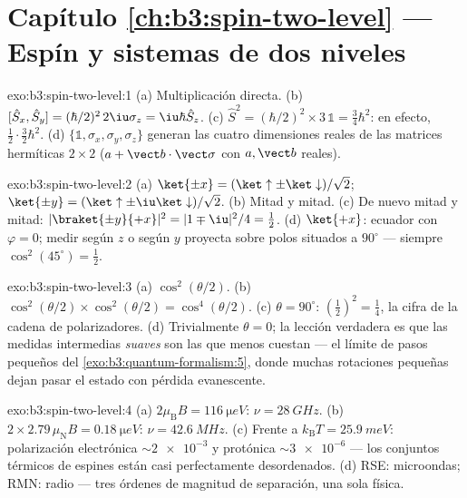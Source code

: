 \section*{Capítulo \ref{ch:b3:spin-two-level} --- Espín y sistemas de dos niveles}

\begin{solution}{exo:b3:spin-two-level:1}
(a) Multiplicación directa. (b) $[\hat S_x, \hat S_y] =
(\hbar/2)^2\,2\iu\sigma_z = \iu\hbar\hat S_z$. (c) $\hat S^2 =
(\hbar/2)^2 \times 3\,\mathbb 1 = \tfrac34\hbar^2$: en efecto,
$\tfrac12\cdot\tfrac32\hbar^2$. (d) $\{\mathbb 1, \sigma_x,
\sigma_y, \sigma_z\}$ generan las cuatro dimensiones reales de las matrices
hermíticas $2\times2$ ($a + \vect b\cdot\vect\sigma$ con $a,
\vect b$ reales).
\end{solution}

\begin{solution}{exo:b3:spin-two-level:2}
(a) $\ket{\pm x} = (\ket\uparrow \pm \ket\downarrow)/\sqrt2$;
$\ket{\pm y} = (\ket\uparrow \pm \iu\ket\downarrow)/\sqrt2$. (b)
Mitad y mitad. (c) De nuevo mitad y mitad: $|\braket{\pm y}{+x}|^2 =
|1 \mp \iu|^2/4 = \tfrac12$. (d) $\ket{+x}$: ecuador con $\varphi =
0$; medir según $z$ o según $y$ proyecta sobre polos situados a $90^\circ$
--- siempre $\cos^2(45^\circ) = \tfrac12$.
\end{solution}

\begin{solution}{exo:b3:spin-two-level:3}
(a) $\cos^2(\theta/2)$. (b) $\cos^2(\theta/2) \times
\cos^2(\theta/2) = \cos^4(\theta/2)$. (c) $\theta = 90^\circ$:
$(\tfrac12)^2 = \tfrac14$, la cifra de la cadena de polarizadores. (d)
Trivialmente $\theta = 0$; la lección verdadera es que las medidas
intermedias \emph{suaves} son las que menos cuestan --- el límite de pasos
pequeños del \cref{exo:b3:quantum-formalism:5}, donde muchas rotaciones
pequeñas dejan pasar el estado con pérdida evanescente.
\end{solution}

\begin{solution}{exo:b3:spin-two-level:4}
(a) $2\mu_{\text{B}}B = \qty{116}{\micro eV}$: $\nu =
\qty{28}{GHz}$. (b) $2 \times 2.79\,\mu_{\text{N}}B =
\qty{0.18}{\micro eV}$: $\nu = \qty{42.6}{MHz}$. (c) Frente a
$k_{\text{B}}T = \qty{25.9}{meV}$: polarización electrónica
$\sim\num{2e-3}$ y protónica $\sim\num{3e-6}$ --- los conjuntos térmicos de
espines están casi perfectamente desordenados. (d) RSE: microondas;
RMN: radio --- tres órdenes de magnitud de separación, una sola física.
\end{solution}

